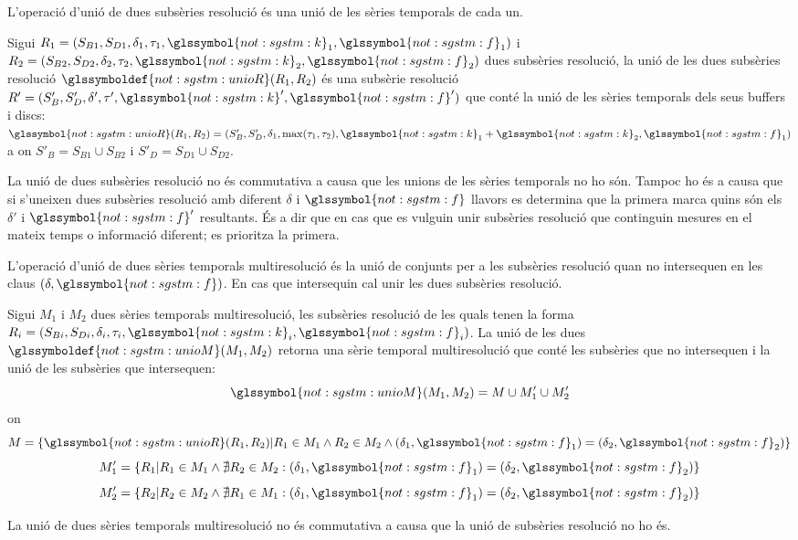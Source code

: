 L'operació d'unió de dues subsèries resolució és una unió de les
sèries temporals de cada un.
\begin{definition}
  Sigui
  $R_1=(S_{B1},S_{D1},\delta_1,\tau_1,\glssymbol{not:sgstm:k}_1,\glssymbol{not:sgstm:f}_1)$
  i
  $R_2=(S_{B2},S_{D2},\delta_2,\tau_2,\glssymbol{not:sgstm:k}_2,\glssymbol{not:sgstm:f}_2)$
  dues subsèries resolució, la unió de les dues subsèries resolució
  $\glssymboldef{not:sgstm:unioR}(R_1,R_2)$ és una subsèrie resolució
  $R' =
  (S'_B,S'_D,\delta',\tau',\glssymbol{not:sgstm:k}',\glssymbol{not:sgstm:f}')$
  que conté la unió de les sèries temporals dels seus buffers i discs:
  $\glssymbol{not:sgstm:unioR}(R_1,R_2)=
  (S'_B,S'_D,\delta_1,\max(\tau_1,\tau_2),\glssymbol{not:sgstm:k}_1+\glssymbol{not:sgstm:k}_2,\glssymbol{not:sgstm:f}_1)$
  a on $S'_B = S_{B1} \cup S_{B2}$ i $S'_D = S_{D1} \cup S_{D2}$.
\end{definition}
La unió de dues subsèries resolució no és commutativa a causa que les
unions de les sèries temporals no ho són. Tampoc ho és a causa que si
s'uneixen dues subsèries resolució amb diferent $\delta$ i
$\glssymbol{not:sgstm:f}$ llavors es determina que la primera marca
quins són els $\delta'$ i $\glssymbol{not:sgstm:f}'$ resultants.  És a
dir que en cas que es vulguin unir subsèries resolució que continguin
mesures en el mateix temps o informació diferent; es prioritza la
primera.


L'operació d'unió de dues sèries temporals multiresolució és la unió
de conjunts per a les subsèries resolució quan no intersequen en les
claus $(\delta,\glssymbol{not:sgstm:f})$. En cas que intersequin cal
unir les dues subsèries resolució.
\begin{definition}
  Sigui $M_1$ i $M_2$ dues sèries temporals multiresolució, les
  subsèries resolució de les quals tenen la forma
  $R_i=(S_{Bi},S_{Di},\delta_i,\tau_i,\glssymbol{not:sgstm:k}_i,\glssymbol{not:sgstm:f}_i)$. La
  unió de les dues $\glssymboldef{not:sgstm:unioM}(M_1, M_2)$ retorna
  una sèrie temporal multiresolució que conté les subsèries que no
  intersequen i la unió de les subsèries que intersequen:
  \[
  \glssymbol{not:sgstm:unioM}(M_1, M_2)= M \cup M'_{1} \cup
  M'_{2}\] on 
  \[
  M = \{\glssymbol{not:sgstm:unioR}(R_1,R_2) | R_1\in M_1 \wedge
  R_2\in M_2 \wedge (\delta_1,\glssymbol{not:sgstm:f}_1) =
  (\delta_2,\glssymbol{not:sgstm:f}_2) \}
  \]
  \[
  M_1' =\{ R_1 | R_1\in M_1 \wedge \nexists R_2 \in M_2 :
  (\delta_1,\glssymbol{not:sgstm:f}_1) =
  (\delta_2,\glssymbol{not:sgstm:f}_2) \}
  \]
  \[
  M_2' =\{R_2 | R_2\in M_2 \wedge \nexists R_1 \in M_1 :
  (\delta_1,\glssymbol{not:sgstm:f}_1) =
  (\delta_2,\glssymbol{not:sgstm:f}_2) \}
  \]
\end{definition}
La unió de dues sèries temporals multiresolució no és commutativa
 a causa que la unió de subsèries resolució no ho és.





